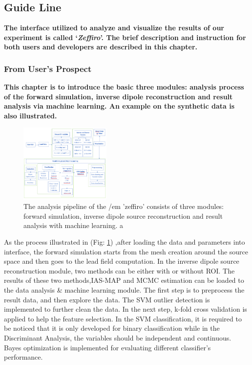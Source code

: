 \documentclass[5p]{elsarticle}
\begin{document}
\begin{frontmatter}
\section{Guide Line}
\bf The interface utilized to analyze and visualize the results of our experiment is called ‘{\em Zeffiro}’. The brief description and instruction for both users and developers are described in this chapter.

\subsubsection{From User's Prospect}

\bf This chapter is to introduce the basic three modules: analysis process of the forward simulation, inverse dipole reconstruction and result analysis via machine learning. An example on the synthetic data is also illustrated.

    \begin{figure}[h!]
        \begin{center}            \includegraphics[width=0.4\textwidth]{process.PNG}
        \end{center}
        \caption{The analysis pipeline of the {/em 'zeffiro'} consists of three modules: forward simulation, inverse dipole source reconstruction and result analysis with machine learning. a\cite{18}
        }
        \label{fig_3}
    \end{figure}

As the process illustrated in (Fig: \ref{fig_3}) ,after loading the data and parameters into interface, the forward simulation starts from the mesh creation around the source space and then goes to the lead field computation. In the inverse dipole source reconstruction module, two methods can be   either with or without ROI. The results of these two methods,IAS-MAP and MCMC estimation can be loaded to the data analysis & machine learning module. The first step is to preprocess the result data, and then explore the data. The SVM outlier detection is implemented to further clean the data. In the next step, k-fold cross validation is applied to help the feature selection. In the SVM classification, it is required to be noticed that it is only developed for binary classification while in the Discriminant Analysis\cite{21}, the variables should be independent and continuous. Bayes optimization is implemented for evaluating different classifier's performance. 


\end{frontmatter}
\end{document}
